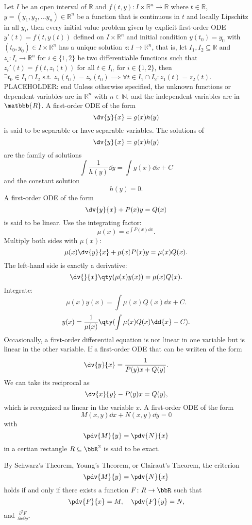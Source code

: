 \documentclass[a4paper,12pt]{report}
\begin{document}
Let $I$ be an open interval of $\mathbb{R}$ and $f(t,y)\colon I\times\mathbb{R}^n\to\mathbb{R}$ where $t\in\mathbb{R}$, $y=(y_1, y_2,\dots  y_n)\in\mathbb{R}^n$ be a function that is continuous in $t$ and locally Lipschitz in all $y_i$, then every initial value problem given by explicit first-order ODE $y'(t)=f\left(t,y(t)\right)$ defined on $I\times\mathbb{R}^n$ and initial condition $y\left(t_{0}\right)=y_{0}$ with $(t_{0},y_{0})\in I\times\mathbb{R}^n$ has a unique solution $z\colon I\to\mathbb {R}^n$, that is, let $I_1,I_2\subseteq\mathbb{R}$ and $z_i\colon I_i\to\mathbb{R}^n$ for $i\in\{1,2\}$ be two differentiable functions such that $z_i'(t)=f\left(t,z_i(t)\right)$ for all $t\in I_i$, for $i\in\{1,2\}$, then $\exists t_0\in I_1\cap I_2\text{\ s.t.\ }z_1(t_0)=z_2(t_0)\implies\forall t\in I_1\cap I_2\colon z_1(t)=z_2(t)$.
PLACEHOLDER: end
Unless otherwise specified, the unknown functions or dependent variables are in $\mathbb{R}^n$ with $n\in\mathbb{N}$, and the independent variables are in $\matbbb{R}$.
A first-order ODE of the form
\[\dv{y}{x}=g(x)h(y)\]
is said to be separable or have separable variables.
The solutions of
\[\dv{y}{x}=g(x)h(y)\]
are the family of solutions
\[\int\frac{1}{h(y)}\dd{y}=\int g(x)\dd{x}+C\]
and the constant solution
\[h(y)=0.\]
A first-order ODE of the form
\[\dv{y}{x}+P(x)y=Q(x)\]
is said to be linear.
Use the integrating factor:
\[\mu(x)=e^{\int P(x)\dd{x}}.\]
Multiply both sides with $\mu(x)$:
\[\mu(x)\dv{y}{x}+\mu(x)P(x)y=\mu(x)Q(x).\]
The left-hand side is exactly a derivative:
\[\dv{}{x}\qty(\mu(x)y(x))=\mu(x)Q(x).\]
Integrate:
\[\mu(x)y(x)=\int\mu(x)Q(x)\dd{x}+C.\]
\[y(x)=\frac{1}{\mu(x)}\qty(\int\mu(x)Q(x)\dd{x}+C).\]
Occasionally, a first-order differential equation is not linear in one variable
but is linear in the other variable. If a first-order ODE that can be wriiten of the form
\[\dv{y}{x}=\frac{1}{P(y)x+Q(y)}.\]
We can take its reciprocal as
\[\dv{x}{y}-P(y)x=Q(y),\]
which is recognized as linear in the variable $x$.
A first-order ODE of the form
\[M(x,y)\dd{x}+N(x,y)\dd{y}=0\]
with
\[\pdv{M}{y}=\pdv{N}{x}\]
in a certian rectangle $R\subseteq\bbR^2$ is said to be exact.

By Schwarz's Theorem, Young's Theorem, or Clairaut's Theorem, the criterion
\[\pdv{M}{y}=\pdv{N}{x}\]
holds if and only if there exists a function $F\colon R\to\bbR$ such that
\[\pdv{F}{x}=M,\quad\pdv{F}{y}=N,\]
and $\frac{\partial^2F}{\partial x\partial y}$.
\end{document}
